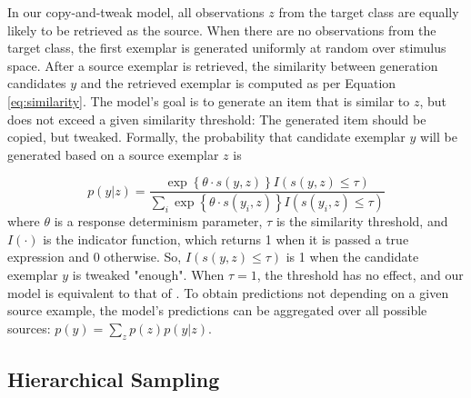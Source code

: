 \documentclass[10pt,letterpaper]{article}
\begin{document}
In our copy-and-tweak model, all observations $z$ from the target class are equally likely to be retrieved as the source. When there are no observations from the target class, the first exemplar is generated uniformly at random over stimulus space. After a source exemplar is retrieved, the similarity between generation candidates $y$ and the retrieved exemplar is computed as per Equation \ref{eq:similarity}. The model's goal is to generate an item that is similar to $z$, but does not exceed a given similarity threshold: The generated item should be copied, but tweaked. Formally, the probability that candidate exemplar $y$ will be generated based on a source exemplar $z$ is 

\begin{equation}
    p(y|z)  = \dfrac
    { \exp \left\{\theta \cdot s(y,z) \right\} I\left(s(y,z) \leq \tau\right) }
    {\sum_i{\exp \left\{ \theta \cdot s(y_i,z) \right\} I\left(s(y_i,z) \leq \tau\right)}} 
\end{equation}
% 
where $\theta$ is a response determinism parameter, $\tau$ is the similarity threshold, and $I(\cdot)$ is the indicator function, which returns 1 when it is passed a true expression and 0 otherwise. So, $I\left(s(y,z) \leq \tau\right)$ is 1 when the candidate exemplar $y$ is tweaked "enough". When $\tau=1$, the threshold has no effect, and our model is equivalent to that of \citet{jern2013probabilistic}. To obtain predictions not depending on a given source example, the model's predictions can be aggregated over all possible sources: $p(y) = \sum_z{p(z)p(y|z)}$.


\subsection{Hierarchical Sampling}
\end{document}
